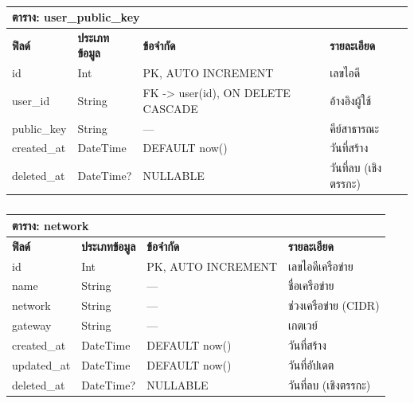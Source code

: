 \begin{table}[htbp]
    \caption{}\label{tab3:user_public_key_fields}
    \centering
    \renewcommand{\arraystretch}{1.2}
    \small
    \begin{tabular}{p{} p{} p{} p{}}
        \hline
        \multicolumn{4}{l}{\textbf{ตาราง: user\_public\_key}} \\
        \hline
            \textbf{ฟิลด์} & \textbf{ประเภทข้อมูล} & \textbf{ข้อจำกัด} & \textbf{รายละเอียด} \\
        \hline
        id & Int & PK, AUTO INCREMENT & เลขไอดี \\
        user\_id & String & FK -> user(id), ON DELETE CASCADE & อ้างอิงผู้ใช้ \\
        public\_key & String & — & คีย์สาธารณะ \\
        created\_at & DateTime & DEFAULT now() & วันที่สร้าง \\
        deleted\_at & DateTime? & NULLABLE & วันที่ลบ (เชิงตรรกะ) \\
        \hline
    \end{tabular}
\end{table}

\begin{table}[htbp]
    \caption{}\label{tab3:network_fields}
    \centering
    \renewcommand{\arraystretch}{1.2}
    \small
    \begin{tabular}{p{} p{} p{} p{}}
        \hline
        \multicolumn{4}{l}{\textbf{ตาราง: network}} \\
        \hline
            \textbf{ฟิลด์} & \textbf{ประเภทข้อมูล} & \textbf{ข้อจำกัด} & \textbf{รายละเอียด} \\
        \hline
        id & Int & PK, AUTO INCREMENT & เลขไอดีเครือข่าย \\
        name & String & — & ชื่อเครือข่าย \\
        network & String & — & ช่วงเครือข่าย (CIDR) \\
        gateway & String & — & เกตเวย์ \\
        created\_at & DateTime & DEFAULT now() & วันที่สร้าง \\
        updated\_at & DateTime & DEFAULT now() & วันที่อัปเดต \\
        deleted\_at & DateTime? & NULLABLE & วันที่ลบ (เชิงตรรกะ) \\
        \hline
    \end{tabular}
\end{table}

